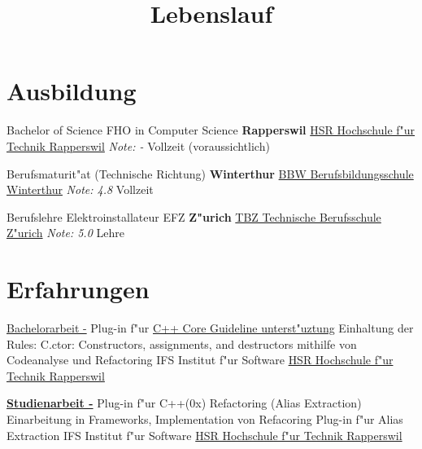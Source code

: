 \documentclass[11pt,legalpaper,sans]{moderncv}
\title{Lebenslauf}
\begin{document}
\makecvtitle

\section{Ausbildung}
{Bachelor of Science FHO in Computer Science}
{\hfill\bfseries Rapperswil}
{\newline{}\href{http://www.hsr.ch/}{HSR Hochschule f"ur Technik Rapperswil}}
{\hfill\textit{Note: -}}
{Vollzeit (voraussichtlich)}

{Berufsmaturit"at (Technische Richtung)}
{\hfill\bfseries Winterthur}
{\newline{}\href{http://www.bbw.ch/}{BBW Berufsbildungsschule Winterthur}}
{\hfill\textit{Note: 4.8}}
{Vollzeit}

{Berufslehre Elektroinstallateur EFZ}
{\hfill\bfseries Z"urich}
{\newline{}\href{htttp://www.tbz.ch/}{TBZ Technische Berufsschule Z"urich}}
{\hfill\textit{Note: 5.0}}
{Lehre}

\section{Erfahrungen}
{\href{http://sinv-56012.edu.hsr.ch/ccglator}{Bachelorarbeit -} Plug-in f"ur \href{https://github.com/isocpp/CppCoreGuidelines/blob/master/CppCoreGuidelines.md}{C++ Core Guideline unterst"uztung}}{}
{\newline{}Einhaltung der Rules: C.ctor: Constructors, assignments, and destructors mithilfe von Codeanalyse und Refactoring}{}
{IFS Institut f"ur Software \hfill\href{http://www.hsr.ch/}{HSR Hochschule f"ur Technik Rapperswil}}

{\href{http://sinv-56012.edu.hsr.ch/aliextor}{\textbf{Studienarbeit -}} Plug-in f"ur C++(0x) Refactoring (Alias Extraction)}{}
{\newline{}Einarbeitung in Frameworks, Implementation von Refacoring Plug-in f"ur Alias Extraction}{}
{IFS Institut f"ur Software \hfill\href{http://www.hsr.ch/}{HSR Hochschule f"ur Technik Rapperswil}}
\end{document}
